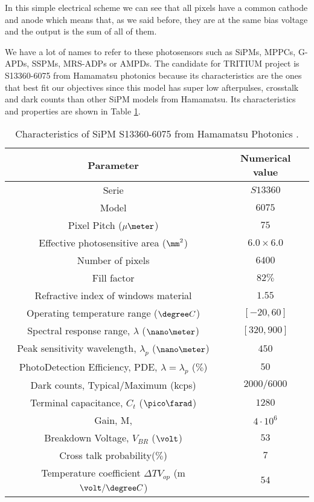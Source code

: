 In this simple electrical scheme we can see that all pixels have a common cathode and anode which means that, as we said before, they are at the same bias voltage and the output is the sum of all of them.

We have a lot of names to refer to these photosensors such as SiPMs, MPPCs, G-APDs, SSPMs, MRS-ADPs or AMPDs. The candidate for TRITIUM project is S13360-6075 from Hamamatsu photonics \cite{DataSheetHammamatsu_1_SiPM_75} because its characteristics are the ones that best fit our objectives since this model has super low afterpulses, crosstalk and dark counts than other SiPM models from Hamamatsu. Its characteristics and properties are shown in Table \ref{tab:PropertiesOfSiPM75}. 

\begin{table}[htbp]
\begin{center}
\begin{tabular}{|c|c|}
\hline
Parameter & Numerical value \\
\hline \hline \hline
Serie & $S13360$ \\ \hline
Model & $6075$ \\ \hline
Pixel Pitch ($\mu\meter$) & $75$ \\ \hline
Effective photosensitive area ($\mm^2$) & $6.0 \times 6.0$ \\ \hline
Number of pixels & $6400$ \\ \hline
Fill factor & $82\%$ \\ \hline
Refractive index of windows material & $1.55$ \\ \hline
Operating temperature range ($\degree C$)& $[-20,60]$ \\ \hline
Spectral response range, $\lambda$ ($\nano\meter$) & $[320, 900]$ \\ \hline
Peak sensitivity wavelength, $\lambda_p$ ($\nano\meter$) & $450$ \\ \hline
PhotoDetection Efficiency, PDE, $\lambda=\lambda_p$ ($\%$) & $50$ \\ \hline
Dark counts, Typical/Maximum (kcps) & $2000/6000$ \\ \hline
Terminal capacitance, $C_t$ ($\pico\farad$) & $1280$ \\ \hline
Gain, M, & $4 \cdot{} 10^6$ \\ \hline
Breakdown Voltage, $V_{BR}$ ($\volt$) & $53$ \\ \hline
Cross talk probability($\%$) & $7$ \\ \hline
Temperature coefficient $\Delta TV_{op}$ (m$\volt/\degree C$) & $54$ \\ \hline
\end{tabular}
\caption{Characteristics of SiPM S13360-6075 from Hamamatsu Photonics \cite{DataSheetHammamatsu_1_SiPM_75}.}
\label{tab:PropertiesOfSiPM75}
\end{center}
\end{table}

